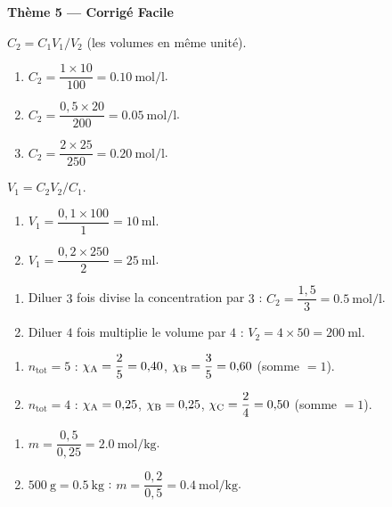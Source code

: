 \documentclass[11pt,a4paper]{article}
\begin{document}
\begin{center}{\large\bfseries\color{primarydark} Thème 5 — Corrigé Facile}\end{center}

\begin{corrige}
$C_2 = C_1 V_1 / V_2$ (les volumes en même unité).
\begin{enumerate}[label=\alph*)]
  \item $C_2 = \dfrac{1\times 10}{100} = \SI{0.10}{\mole\per\litre}$.
  \item $C_2 = \dfrac{0{,}5\times 20}{200} = \SI{0.05}{\mole\per\litre}$.
  \item $C_2 = \dfrac{2\times 25}{250} = \SI{0.20}{\mole\per\litre}$.
\end{enumerate}
\end{corrige}

\begin{corrige}
$V_1 = C_2 V_2 / C_1$.
\begin{enumerate}[label=\alph*)]
  \item $V_1 = \dfrac{0{,}1\times 100}{1} = \SI{10}{\milli\litre}$.
  \item $V_1 = \dfrac{0{,}2\times 250}{2} = \SI{25}{\milli\litre}$.
\end{enumerate}
\end{corrige}

\begin{corrige}
\begin{enumerate}[label=\alph*)]
  \item Diluer $3$ fois divise la concentration par $3$ : $C_2 = \dfrac{1{,}5}{3} = \SI{0.5}{\mole\per\litre}$.
  \item Diluer $4$ fois multiplie le volume par $4$ : $V_2 = 4\times 50 = \SI{200}{\milli\litre}$.
\end{enumerate}
\end{corrige}

\begin{corrige}
\begin{enumerate}[label=\alph*)]
  \item $n_{\text{tot}} = 5$ : $\chi_{\ce{A}} = \dfrac{2}{5} = 0{,}40$, $\chi_{\ce{B}} = \dfrac{3}{5} = 0{,}60$ (somme $=1$).
  \item $n_{\text{tot}} = 4$ : $\chi_{\ce{A}} = 0{,}25$, $\chi_{\ce{B}} = 0{,}25$, $\chi_{\ce{C}} = \dfrac{2}{4} = 0{,}50$ (somme $=1$).
\end{enumerate}
\end{corrige}

\begin{corrige}[molalité]
\begin{enumerate}[label=\alph*)]
  \item $m = \dfrac{0{,}5}{0{,}25} = \SI{2.0}{\mole\per\kilo\gram}$.
  \item $\SI{500}{\gram} = \SI{0.5}{\kilo\gram}$ : $m = \dfrac{0{,}2}{0{,}5} = \SI{0.4}{\mole\per\kilo\gram}$.
\end{enumerate}
\end{corrige}
\end{document}
